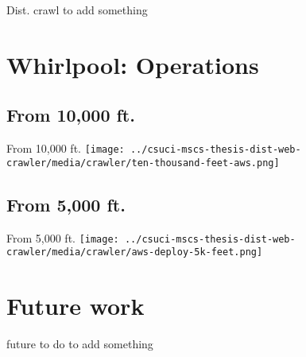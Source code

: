 \documentclass[9pt]{beamer}
\begin{document}
\begin{frame}{Dist. crawl}
  to add something
\end{frame}


\section[Opworks]{Whirlpool: Operations}
\begin{frame}[plain]
\end{frame}


\subsection{From 10,000 ft.}
\begin{frame}{From 10,000 ft.}
 \centering
 \texttt{[image: ../csuci-mscs-thesis-dist-web-crawler/media/crawler/ten-thousand-feet-aws.png]} 
\end{frame}


\subsection{From 5,000 ft.}
\begin{frame}{From 5,000 ft.}
  \centering
  \texttt{[image: ../csuci-mscs-thesis-dist-web-crawler/media/crawler/aws-deploy-5k-feet.png]}
\end{frame}


\section[Future]{Future work}
\begin{frame}[plain]
\end{frame}


\begin{frame}{future to do}
  to add something
\end{frame}


%  


\begin{frame}[plain]
\end{frame}
\end{document}
